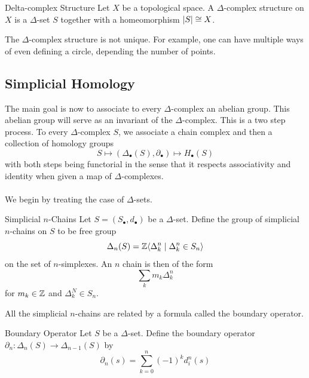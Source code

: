 \documentclass[a4paper]{article}
\begin{document}
\begin{defn}{Delta-complex Structure}{} Let $X$ be a topological space. A $\Delta$-complex structure on $X$ is a $\Delta$-set $S$ together with a homeomorphism $\abs{S}\cong X$. 
\end{defn}

The $\Delta$-complex structure is not unique. For example, one can have multiple ways of even defining a circle, depending the number of points. 

\subsection{Simplicial Homology}
The main goal is now to associate to every $\Delta$-complex an abelian group. This abelian group will serve as an invariant of the $\Delta$-complex. This is a two step process. To every $\Delta$-complex $S$, we associate a chain complex and then a collection of homology groups $$S\mapsto(\Delta_\bullet(S),\partial_\bullet)\mapsto H_\bullet(S)$$ with both steps being functorial in the sense that it respects associativity and identity when given a map of $\Delta$-complexes. \\~\\

We begin by treating the case of $\Delta$-sets. 

\begin{defn}{Simplicial $n$-Chains}{} Let $S=(S_\bullet,d_\bullet)$ be a $\Delta$-set. Define the group of simplicial $n$-chains on $S$ to be free group $$\Delta_n(S)=\mathbb{Z}\langle\Delta_k^n\;|\;\Delta_k^n\in S_n\rangle$$ on the set of $n$-simplexes. An $n$ chain is then of the form $$\sum_km_k\Delta_k^n$$ for $m_k\in\mathbb{Z}$ and $\Delta_k^N\in S_n$. 
\end{defn}

All the simplicial $n$-chains are related by a formula called the boundary operator. 

\begin{defn}{Boundary Operator}{} Let $S$ be a $\Delta$-set. Define the boundary operator $\partial_n:\Delta_n(S)\to\Delta_{n-1}(S)$ by $$\partial_n(s)=\sum_{k=0}^n(-1)^kd_i^n(s)$$
\end{defn}
\end{document}
